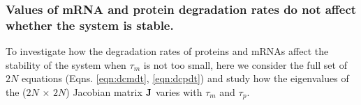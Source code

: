 \documentclass[10pt]{article}
\begin{document}



\subsubsection*{Values of mRNA and protein degradation rates do not affect whether the system is stable.}
To investigate how the degradation rates of proteins and mRNAs affect the stability of the system when $\tau_m$ is not too small, here we consider the full set of $2N$ equations (Eqns. \ref{eqn:dcmdt}, \ref{eqn:dcpdt}) and study how the eigenvalues of the ($2N$ $\times$ $2N$) Jacobian matrix $\bf{J}$ varies with $\tau_m$ and $\tau_p$.
\end{document}
